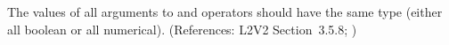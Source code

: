 The values of all arguments to  and  operators should
have the same type (either all boolean or all numerical).
(References: L2V2 Section~3.5.8; )
